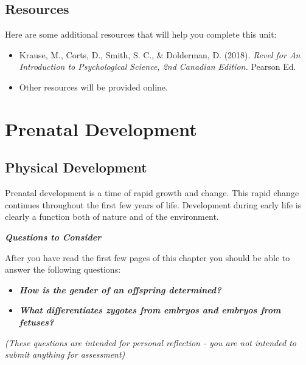 \documentclass[
]{book}
\providecommand{\tightlist}{%
  \setlength{\itemsep}{0pt}\setlength{\parskip}{0pt}}
\begin{document}
\hypertarget{resources}{%
\subsection*{Resources}\label{resources}}

Here are some additional resources that will help you complete this unit:

\begin{itemize}
\tightlist
\item
  Krause, M., Corts, D., Smith, S. C., \& Dolderman, D. (2018). \emph{Revel for An Introduction to Psychological Science, 2nd Canadian Edition.} Pearson Ed.\\
\item
  Other resources will be provided online.
\end{itemize}

\hypertarget{prenatal-development}{%
\section{Prenatal Development}\label{prenatal-development}}

\hypertarget{physical-development}{%
\subsection*{Physical Development}\label{physical-development}}

Prenatal development is a time of rapid growth and change. This rapid change continues throughout the first few years of life. Development during early life is clearly a function both of nature and of the environment.

\textbf{\emph{Questions to Consider}}

After you have read the first few pages of this chapter you should be able to answer the following questions:

\begin{itemize}
\tightlist
\item
  \textbf{\emph{How is the gender of an offspring determined?}}
\item
  \textbf{\emph{What differentiates zygotes from embryos and embryos from fetuses?}}
\end{itemize}

\emph{(These questions are intended for personal reflection - you are not intended to submit anything for assessment)}
\end{document}
